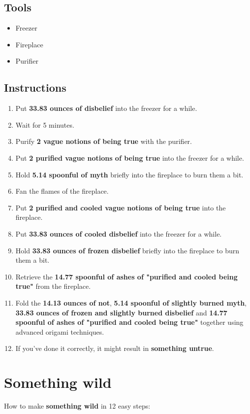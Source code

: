 \documentclass{article}
\begin{document}
\subsection{Tools}\begin{itemize}
\item 
Freezer
\item 
Fireplace
\item 
Purifier
\end{itemize}
\subsection{Instructions}\begin{enumerate}
\item 
Put \textbf{33.83 ounces of disbelief} into the freezer for a while.
\item 
Wait for 5 minutes.
\item 
Purify \textbf{2 vague notions of being true} with the purifier.
\item 
Put \textbf{2 purified vague notions of being true} into the freezer for a while.
\item 
Hold \textbf{5.14 spoonful of myth} briefly into the fireplace to burn them a bit.
\item 
Fan the flames of the fireplace.
\item 
Put \textbf{2 purified and cooled vague notions of being true} into the fireplace.
\item 
Put \textbf{33.83 ounces of cooled disbelief} into the freezer for a while.
\item 
Hold \textbf{33.83 ounces of frozen disbelief} briefly into the fireplace to burn them a bit.
\item 
Retrieve the \textbf{14.77 spoonful of ashes of "purified and cooled being true"} from the fireplace.
\item 
Fold the \textbf{14.13 ounces of not}, \textbf{5.14 spoonful of slightly burned myth}, \textbf{33.83 ounces of frozen and slightly burned disbelief} and \textbf{14.77 spoonful of ashes of "purified and cooled being true"} together using advanced origami techniques.
\item 
If you've done it correctly, it might result in \textbf{something untrue}.
\end{enumerate}
\newpage
\section{Something wild}How to make \textbf{something wild} in 12 easy steps:
\end{document}
